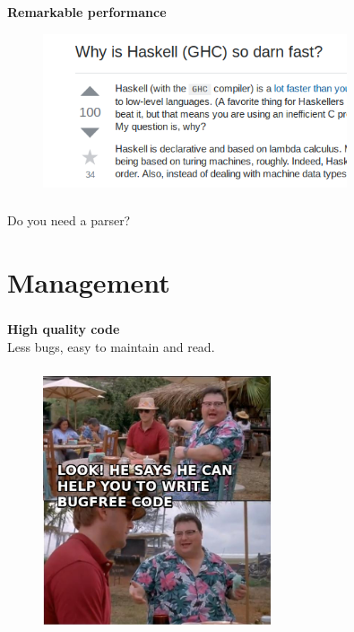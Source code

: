 \documentclass[usenames,dvipsnames, 18pt, compress, aspectratio=169]{beamer}
\begin{document}
\begin{frame}
    \frametitle{}
    \begin{center}
    \textbf{Remarkable performance}
    \begin{figure}
        \includegraphics[width=0.8\textwidth,center]{haskell_fast.png}
    \end{figure}
    \end{center}
\end{frame}

\begin{frame}
    \frametitle{}
    \begin{center}
    Do you need a parser?
    \end{center}
\end{frame}

\fontsize{13pt}{14}\selectfont
\section{Management}
\fontsize{17pt}{18}\selectfont

\begin{frame}
    \frametitle{}
    \begin{center}
    \textbf{High quality code}\\
    Less bugs, easy to maintain and read.
    \end{center}
\end{frame}

\begin{frame}
    \frametitle{}
    \begin{center}
    \begin{figure}
        \includegraphics[width=0.6\textwidth,center]{See_Nobody_Cares.jpg}
    \end{figure}
    \end{center}
\end{frame}
\end{document}
